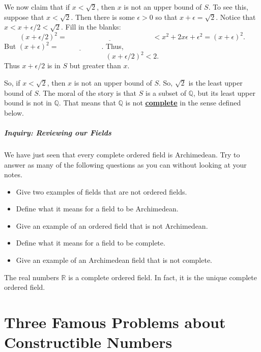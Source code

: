 \documentclass[11pt]{article}
\newenvironment{task}
	{\begin{mdframed}[linecolor=lightgray, linewidth=3pt]\raggedright}
	{\end{mdframed}}
\renewcommand\emph[1]{\underline{\bf{#1}}} %
\theoremstyle{definition}
\begin{document}
\begin{task}
  We now claim that
  if $x < \sqrt{2}$, then $x$ is not an upper bound of $S$. To see this, suppose that $x < \sqrt{2}$. Then there is
  some $\epsilon > 0$ so that $x+\epsilon = \sqrt{2}$. Notice that $x < x + \epsilon/2 < \sqrt{2}$. Fill in the blanks:
  \[ (x + \epsilon/2)^2 = \underline{\hspace{2in}} < x^2 + 2x\epsilon + \epsilon^2 = (x+\epsilon)^2. \]
  But $(x+\epsilon)^2 = \underline{\hspace{1in}}$. Thus,
  \[ (x+\epsilon/2)^2 < 2. \]
  Thus $x+\epsilon/2$ is in $S$ but greater than $x$. 
  
  So, if $x<\sqrt{2}$, then $x$ is not an upper bound of $S$. So, $\sqrt{2}$ is the least upper bound of $S$. The moral of the story is
  that $S$ is a subset of $\mathbb{Q}$, but its least upper bound is not in $\mathbb{Q}$. That means that $\mathbb{Q}$ is not \emph{complete}
  in the sense defined below.
\end{task}\newpage

\subsubsection{Inquiry: Reviewing our Fields}

\begin{task}
  We have just seen that every complete ordered field is Archimedean. Try to answer as many of the following questions as you can
  without looking at your notes.
  \begin{itemize}
    \item Give two examples of fields that are not ordered fields.
    \item Define what it means for a field to be Archimedean.
    \item Give an example of an ordered field that is not Archimedean.
    \item Define what it means for a field to be complete.
    \item Give an example of an Archimedean field that is not complete.
  \end{itemize}
  The real numbers $\mathbb{R}$ is a complete ordered field. In fact, it is the unique complete ordered field.
\end{task}


\part{Three Famous Problems about Constructible Numbers}
\end{document}
